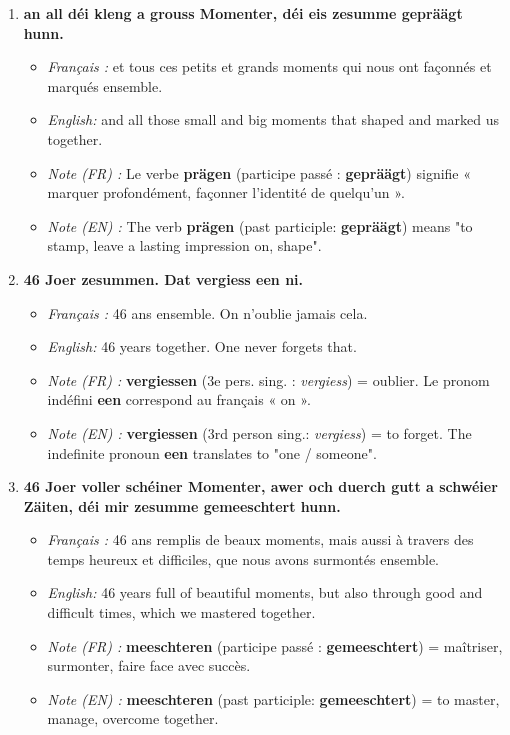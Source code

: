 \begin{enumerate}
    \item \textbf{an all déi kleng a grouss Momenter, déi eis zesumme gepräägt hunn.}
    \begin{itemize}
        \item \textit{Français :} et tous ces petits et grands moments qui nous ont façonnés et marqués ensemble.
        \item \textit{English:} and all those small and big moments that shaped and marked us together.
        \item \textit{Note (FR) :} Le verbe \textbf{prägen} (participe passé : \textbf{gepräägt}) signifie « marquer profondément, façonner l'identité de quelqu'un ».
        \item \textit{Note (EN) :} The verb \textbf{prägen} (past participle: \textbf{gepräägt}) means "to stamp, leave a lasting impression on, shape".
    \end{itemize}

    \vspace{0.6em}

    \item \textbf{46 Joer zesummen. Dat vergiess een ni.}
    \begin{itemize}
        \item \textit{Français :} 46 ans ensemble. On n'oublie jamais cela.
        \item \textit{English:} 46 years together. One never forgets that.
        \item \textit{Note (FR) :} \textbf{vergiessen} (3e pers. sing. : \textit{vergiess}) = oublier. Le pronom indéfini \textbf{een} correspond au français « on ».
        \item \textit{Note (EN) :} \textbf{vergiessen} (3rd person sing.: \textit{vergiess}) = to forget. The indefinite pronoun \textbf{een} translates to "one / someone".
    \end{itemize}

    \vspace{0.6em}

    \item \textbf{46 Joer voller schéiner Momenter, awer och duerch gutt a schwéier Zäiten, déi mir zesumme gemeeschtert hunn.}
    \begin{itemize}
        \item \textit{Français :} 46 ans remplis de beaux moments, mais aussi à travers des temps heureux et difficiles, que nous avons surmontés ensemble.
        \item \textit{English:} 46 years full of beautiful moments, but also through good and difficult times, which we mastered together.
        \item \textit{Note (FR) :} \textbf{meeschteren} (participe passé : \textbf{gemeeschtert}) = maîtriser, surmonter, faire face avec succès.
        \item \textit{Note (EN) :} \textbf{meeschteren} (past participle: \textbf{gemeeschtert}) = to master, manage, overcome together.
    \end{itemize}


\end{enumerate}
